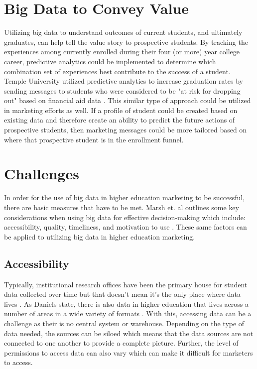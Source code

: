 \documentclass[sigconf]{acmart}
\begin{document}
\section{Big Data to Convey Value}
Utilizing big data to understand outcomes of current students, and ultimately graduates, can help tell the value story to prospective students. By tracking the experiences among currently enrolled during their four (or more) year college career, predictive analytics could be implemented to determine which combination set of experiences best contribute to the success of a student. Temple University utilized predictive analytics to increase graduation rates by sending messages to students who were considered to be "at risk for dropping out" based on financial aid data \cite{Zinshteyn2016}. This similar type of approach could be utilized in marketing efforts as well. If a profile of student could be created based on existing data and therefore create an ability to predict the future actions of prospective students, then marketing messages could be more tailored based on where that prospective student is in the enrollment funnel. 

\section{Challenges}
In order for the use of big data in higher education marketing to be successful, there are basic measures that have to be met. Marsh et. al outlines some key considerations when using big data for effective decision-making which include: accessibility, quality, timeliness, and motivation to use \cite{Marsh2006}. These same factors can be applied to utilizing big data in higher education marketing.  

\subsection{Accessibility}
Typically, institutional research offices have been the primary house for student data collected over time but that doesn't mean it's the only place where data lives \cite{Picciano2012}. As Daniels state, there is also data in higher education that lives across a number of areas in a wide variety of formats \cite{Daniel2015}. With this, accessing data can be a challenge as their is no central system or warehouse. Depending on the type of data needed, the sources can be siloed which means that the data sources are not connected to one another to provide a complete picture. Further, the level of permissions to access data can also vary which can make it difficult for marketers to access. 
\end{document}
